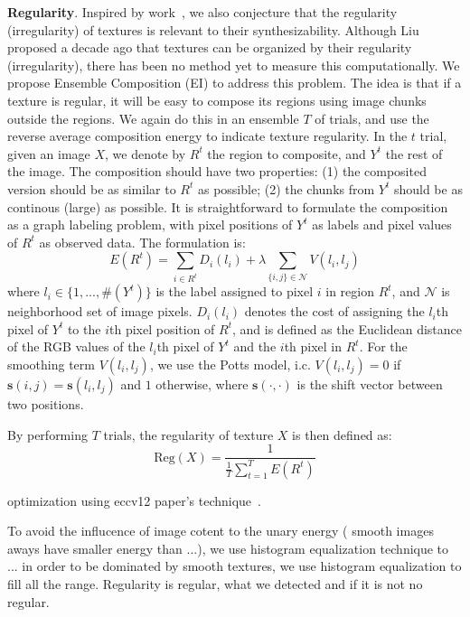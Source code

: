 \textbf{Regularity}. Inspired by work~\cite{Liu:2004:NTA}, we also
conjecture that the regularity (irregularity) of textures is relevant
to their synthesizability. Although Liu \etal~\cite{Liu:2004:NTA}
proposed a decade ago that textures can be organized by their
regularity (irregularity), there has been no method yet to measure
this computationally. We propose Ensemble Composition (EI) to address
this problem. The idea is that if a texture is regular, it will be
easy to compose its regions using image chunks outside the regions. We
again do this in an ensemble $T$ of trials, and use the reverse
average composition energy to indicate texture regularity. In the $t$
trial, given an image $X$, we denote by $R^t$ the region to composite,
and $Y^t$ the rest of the image. The composition should have two
properties: (1) the composited version should be as similar to $R^t$ as
possible; (2) the chunks from $Y^t$ should be as continous (large) as
possible. It is straightforward to formulate the composition as
a graph labeling problem, with pixel positions of $Y^t$ as labels and
pixel values of $R^t$ as observed data. The formulation is:
\begin{equation}
  \label{eq:regu:energy}
  E(R^t) = \sum_{i\in R^t}D_i(l_i) + \lambda \sum_{\{i,j\} \in \mathcal{N}}V(l_i, l_j)
\end{equation}
where $l_i \in \{1, ..., \#(Y^t)\}$ is the label assigned to pixel $i$
in region $R^t$, and $\mathcal{N}$ is neighborhood set of image
pixels. $D_i(l_i)$ denotes the cost of assigning the $l_i$th pixel of
$Y^t$ to the $i$th pixel position of $R^t$, and is defined as the
Euclidean distance of the RGB values of the $l_i$th pixel of $Y^t$ and
the $i$th pixel in $R^t$. For the smoothing term $V(l_i, l_j)$, we use
the Potts model, i.c. $V(l_i,l_j) = 0$ if $\mathbf{s}(i,
j)=\mathbf{s}(l_i,l_j)$ and $1$ otherwise, where $\mathbf{s}(\cdot,
\cdot)$ is the shift vector between two positions.

By performing $T$ trials, the regularity of texture $X$ is then
defined as:
\begin{equation}
  \label{eq:regularity}
  \text{Reg}(X) = \frac{1}{\frac{1}{T} \sum_{t=1}^{T}E(R^t)}
\end{equation}


optimization using eccv12 paper's technique~\cite{He:completion:eccv12}. 


To avoid the influcence of image cotent to the unary energy (\eg
smooth images aways have smaller energy than ...), we use histogram equalization technique to ...
in order to be dominated by smooth textures, we use histogram
equalization to fill all the range.  Regularity is regular, what we
detected and if it is not no regular.

